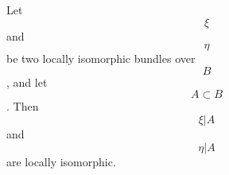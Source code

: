 Let $$\xi$$ and $$\eta$$ be two locally isomorphic bundles over $$B$$, and let $$A \subset B$$. Then $$\xi|A$$ and $$\eta|A$$ are locally isomorphic.
